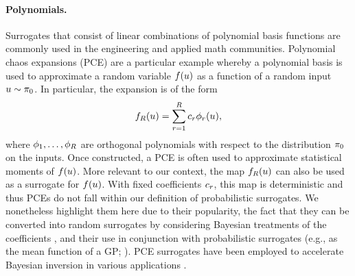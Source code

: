 \documentclass[12pt]{article}
\begin{document}
\paragraph{Polynomials.}
Surrogates that consist of linear combinations of polynomial basis functions are 
commonly used in the engineering and applied math communities. Polynomial 
chaos expansions (PCE) are a particular example whereby a polynomial 
basis is used to approximate a random variable $\func(\Par)$ as a function of
a random input $\Par \sim \priorDens$. In particular, the expansion is of the form
\begin{equation}
\funcEm[\dimBasis](\Par) = \sum_{\idxBasis=1}^{\dimBasis} c_{\idxBasis} \basisVec_{\idxBasis}(\Par),
\end{equation}
where $\basisVec_{1}, \dots, \basisVec_{\dimBasis}$ are orthogonal polynomials with respect 
to the distribution $\priorDens$ on the inputs. Once constructed, a PCE is often used to 
approximate statistical moments of $\func(\Par)$. More relevant to our context,
the map $\funcEm[\dimBasis](\Par)$ can also be used as a surrogate for $\func(\Par)$.
With fixed coefficients $c_{\idxBasis}$, this map is deterministic and thus PCEs do not fall
within our definition of probabilistic surrogates. We nonetheless highlight them here
due to their popularity, the fact that they can be converted into random surrogates by 
considering Bayesian treatments of the coefficients 
\citep{BayesianPCE1,BayesianPCE2,BurknerSurrogate},
and their use in conjunction with probabilistic surrogates (e.g., as the mean function
of a GP; \citet{PCEGPWind,PCEGP2,SinsbeckNowak}). PCE surrogates have been
employed to accelerate Bayesian inversion in various applications 
\citep{dimRedPolyChaos,BurknerSurrogate,PCEBIP}.
\end{document}
